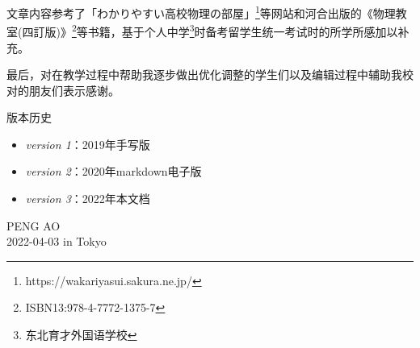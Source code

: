 文章内容参考了「わかりやすい高校物理の部屋」\footnote{https://wakariyasui.sakura.ne.jp/}等网站和河合出版的《物理教室(四訂版)》\footnote{ISBN13:978-4-7772-1375-7}等书籍，基于个人中学\footnote{东北育才外国语学校}时备考留学生统一考试时的所学所感加以补充。

最后，对在教学过程中帮助我逐步做出优化调整的学生们以及编辑过程中辅助我校对的朋友们表示感谢。

\vfill
版本历史
\begin{itemize}
    \item \textit{version 1}：2019年手写版
    \item \textit{version 2}：2020年markdown电子版
    \item \textit{version 3}：2022年本文档
\end{itemize}

\vfill
\begin{flushright}
    PENG AO\\
    2022-04-03 in Tokyo
\end{flushright}


\tableofcontents
